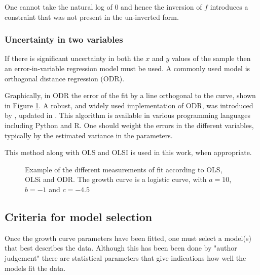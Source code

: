 \documentclass[12pt,a4paper]{article}
\begin{document}
	One cannot take the natural log of 0 and hence the inversion of $f$ introduces a constraint that was not present in the un-inverted form.
	
	\subsubsection{Uncertainty in two variables}
	If there is significant uncertainty in both the $x$ and $y$ values of the sample then an error-in-variable regression model must be used. A commonly used model is orthogonal distance regression (ODR). 
	
	Graphically, in ODR the error of the fit by a line orthogonal to the curve, shown in Figure \ref{fig:Regression_error_direction}. A robust, and widely used implementation of ODR, was introduced by \textcite{Boggs1989}, updated in \textcite{Zwolak2007}. This algorithm is available in various programming languages including Python and R. 	One should weight the errors in the different variables, typically by the estimated variance in the parameters.
	
	This method along with OLS and OLSI is used in this work, when appropriate.
	
	\begin{figure}
		\centering
		\caption{Example of the different measurements of fit according to OLS, OLSi and ODR. The growth curve is a logistic curve, with $a=10$, $b=-1$ and $c=-4.5$}\label{fig:Regression_error_direction}
	\end{figure}

	\subsection{Criteria for model selection}
	Once the growth curve parameters have been fitted, one must select a model(s) that best describes the data. Although this has been been done by "author judgement" there are statistical parameters that give indications how well the models fit the data.
	
\end{document}
